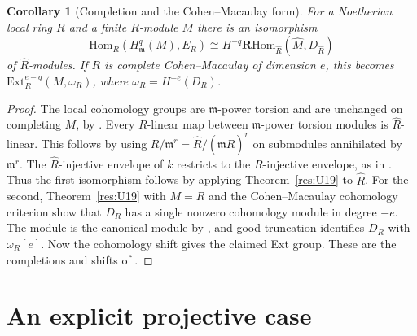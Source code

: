 \documentclass[11pt,oneside,openany]{book}
\newtheorem{corollary}[theorem]{Corollary}
\theoremstyle{definition}
\theoremstyle{remark}
\begin{document}
\begin{corollary}[Completion and the Cohen--Macaulay form]\label{res:U20}
For a Noetherian local ring \(R\) and a finite \(R\)-module \(M\)
there is an isomorphism
\[
 \mathrm{Hom}_R(H^q_{\mathfrak m}(M),E_R)
   \cong H^{-q}\mathbf R\mathrm{Hom}_{\widehat R}
                             (\widehat M,D_{\widehat R})
\]
of \(\widehat R\)-modules. If \(R\) is complete Cohen--Macaulay
of dimension \(e\), this becomes
\(\mathrm{Ext}^{e-q}_R(M,\omega_R)\), where
\(\omega_R=H^{-e}(D_R)\).
\end{corollary}
\begin{proof}
The local cohomology groups are \(\mathfrak m\)-power torsion
and are unchanged on completing \(M\), by \cite[L02, L09]{ca-topics}.
Every \(R\)-linear map between \(\mathfrak m\)-power torsion
modules is \(\widehat R\)-linear. This follows by using
\(R/\mathfrak m^r=\widehat R/(\mathfrak m\widehat R)^r\)
on submodules annihilated by \(\mathfrak m^r\). The
\(\widehat R\)-injective envelope of \(k\) restricts
to the \(R\)-injective envelope, as in \cite[M06]{ca-topics}.
Thus the first isomorphism follows by applying
Theorem~\ref{res:U19} to \(\widehat R\). For the second,
Theorem~\ref{res:U19} with \(M=R\) and the
Cohen--Macaulay cohomology criterion \cite[V07]{ca-topics}
show that \(D_R\) has a single nonzero cohomology
module in degree \(-e\). The module is the canonical
module by \cite[D08]{ca-topics}, and good truncation
identifies \(D_R\) with \(\omega_R[e]\). Now the
cohomology shift gives the claimed Ext group. These
are the completions and shifts of \cite[D07--D09]{ca-topics}.
\end{proof}

\section{An explicit projective case}
\end{document}
